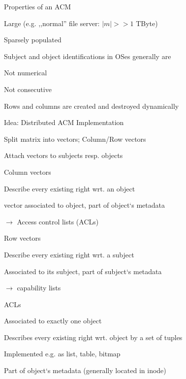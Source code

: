 \documentclass[a4paper]{article}
\begin{document}
\begin{multicols}{3}
    Properties of an ACM
    \begin{itemize*}
        \item Large (e.g. ,,normal'' file server: $|m| >> 1$ TByte)
        \item Sparsely populated
        \item Subject and object identifications in OSes generally are
        \begin{itemize*}
            \item Not numerical
            \item Not consecutive
        \end{itemize*}
        \item Rows and columns are created and destroyed dynamically
    \end{itemize*}

    Idea: Distributed ACM Implementation
    \begin{enumerate*}
        \item Split matrix into vectors; Column/Row vectors
        \item Attach vectors to subjects resp. objects
    \end{enumerate*}
    \begin{itemize*}
        \item Column vectors
        \begin{itemize*}
            \item Describe every existing right wrt. an object
            \item vector associated to object, part of object‘s metadata
            \item[$\rightarrow$] Access control lists (ACLs)
        \end{itemize*}
        \item Row vectors
        \begin{itemize*}
            \item Describe every existing right wrt. a subject
            \item Associated to its subject, part of subject‘s metadata
            \item[$\rightarrow$] capability lists
        \end{itemize*}
    \end{itemize*}

    ACLs
    \begin{itemize*}
        \item Associated to exactly one object
        \item Describes every existing right wrt. object by a set of tuples
        \item Implemented e.g. as list, table, bitmap
        \item Part of object‘s metadata (generally located in inode)
    \end{itemize*}


\end{multicols}
\end{document}
